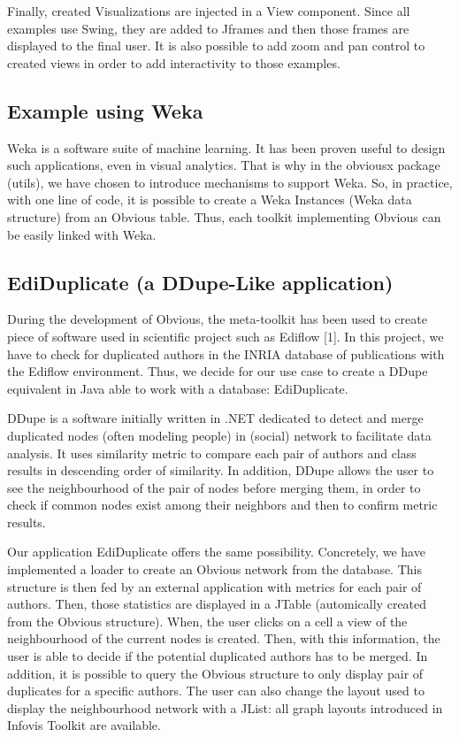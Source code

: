 Finally,  created Visualizations are injected in a View component. Since all examples use Swing, they are added to Jframes and then those frames are displayed to the final user. It is also possible to add zoom and pan control to created views in order to add interactivity to those examples.

\subsection{Example using Weka}

Weka is a software suite of machine learning. It has been proven useful to design such applications, even in visual analytics. That is why in the obviousx package (utils), we have chosen to introduce mechanisms to support Weka. So, in practice, with one line of code, it is possible to create a Weka Instances (Weka data structure) from an Obvious table. Thus, each toolkit implementing Obvious can be easily linked with Weka.

\subsection{EdiDuplicate (a DDupe-Like application)}

During the development of Obvious, the meta-toolkit has been used to create piece of software used in scientific project such as Ediflow [1]. In this project, we have to check for  duplicated authors in the INRIA database of publications with the Ediflow environment. Thus, we decide for our use case to create a DDupe equivalent in Java able to work with a database: EdiDuplicate.

DDupe is a software initially written in .NET dedicated to detect and merge duplicated nodes (often modeling people)  in (social) network to facilitate data analysis. It uses similarity metric to compare each pair  of authors and class results in descending order of similarity. In addition, DDupe allows the user to see the neighbourhood of the pair of nodes before merging them, in order to check if common nodes exist among their neighbors and then to confirm metric results.

Our application EdiDuplicate offers the same possibility. Concretely, we have implemented a loader to create an Obvious network from the  database. This structure is then fed by an external application with metrics for each pair of authors. Then, those statistics are displayed in a JTable (automically created from the Obvious structure). When, the user clicks on a cell a view of the neighbourhood of the current nodes is created. Then, with this information, the user is able to decide if the potential duplicated authors has to be merged. In addition, it is possible to query the Obvious structure to only display pair of duplicates for a specific authors. The user can also change the layout used to display the neighbourhood network with a JList: all graph layouts introduced in Infovis Toolkit are available. 

